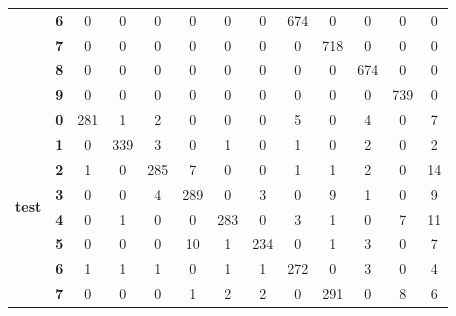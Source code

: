 \begin{table}[htp]
\begin{tabular}{|c|c|c|c|c|c|c|c|c|c|c|c|c|}
		& \textbf{6} & 0          & 0          & 0          & 0          & 0          & 0          & 674        & 0          & 0          & 0          & 0                \\ \cline{2-13} 
		& \textbf{7} & 0          & 0          & 0          & 0          & 0          & 0          & 0          & 718        & 0          & 0          & 0                \\ \cline{2-13} 
		& \textbf{8} & 0          & 0          & 0          & 0          & 0          & 0          & 0          & 0          & 674        & 0          & 0                \\ \cline{2-13} 
		& \textbf{9} & 0          & 0          & 0          & 0          & 0          & 0          & 0          & 0          & 0          & 739        & 0                \\ \hline
		\multirow{10}{*}{\textbf{test}}     & \textbf{0} & 281        & 1          & 2          & 0          & 0          & 0          & 5          & 0          & 4          & 0          & 7                \\ \cline{2-13} 
		& \textbf{1} & 0          & 339        & 3          & 0          & 1          & 0          & 1          & 0          & 2          & 0          & 2                \\ \cline{2-13} 
		& \textbf{2} & 1          & 0          & 285        & 7          & 0          & 0          & 1          & 1          & 2          & 0          & 14               \\ \cline{2-13} 
		& \textbf{3} & 0          & 0          & 4          & 289        & 0          & 3          & 0          & 9          & 1          & 0          & 9                \\ \cline{2-13} 
		& \textbf{4} & 0          & 1          & 0          & 0          & 283        & 0          & 3          & 1          & 0          & 7          & 11               \\ \cline{2-13} 
		& \textbf{5} & 0          & 0          & 0          & 10         & 1          & 234        & 0          & 1          & 3          & 0          & 7                \\ \cline{2-13} 
		& \textbf{6} & 1          & 1          & 1          & 0          & 1          & 1          & 272        & 0          & 3          & 0          & 4                \\ \cline{2-13} 
		& \textbf{7} & 0          & 0          & 0          & 1          & 2          & 2          & 0          & 291        & 0          & 8          & 6                \\ \cline{2-13} 

\end{tabular}
\end{table}
